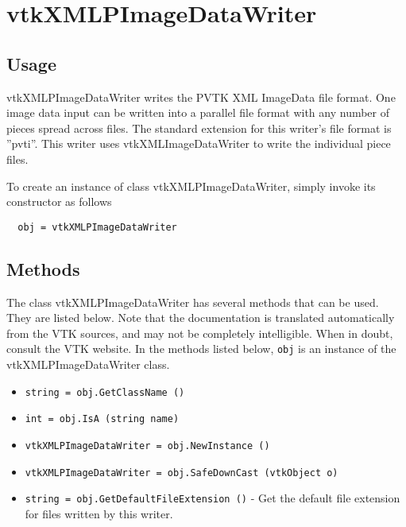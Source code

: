 \section{vtkXMLPImageDataWriter}

\subsection{Usage}

 vtkXMLPImageDataWriter writes the PVTK XML ImageData file format.
 One image data input can be written into a parallel file format
 with any number of pieces spread across files.  The standard
 extension for this writer's file format is ''pvti''.  This writer
 uses vtkXMLImageDataWriter to write the individual piece files.

To create an instance of class vtkXMLPImageDataWriter, simply
invoke its constructor as follows
\begin{verbatim}
  obj = vtkXMLPImageDataWriter
\end{verbatim}
\subsection{Methods}

The class vtkXMLPImageDataWriter has several methods that can be used.
  They are listed below.
Note that the documentation is translated automatically from the VTK sources,
and may not be completely intelligible.  When in doubt, consult the VTK website.
In the methods listed below, \verb|obj| is an instance of the vtkXMLPImageDataWriter class.
\begin{itemize}
\item  \verb|string = obj.GetClassName ()|

\item  \verb|int = obj.IsA (string name)|

\item  \verb|vtkXMLPImageDataWriter = obj.NewInstance ()|

\item  \verb|vtkXMLPImageDataWriter = obj.SafeDownCast (vtkObject o)|

\item  \verb|string = obj.GetDefaultFileExtension ()| -  Get the default file extension for files written by this writer.

\end{itemize}
